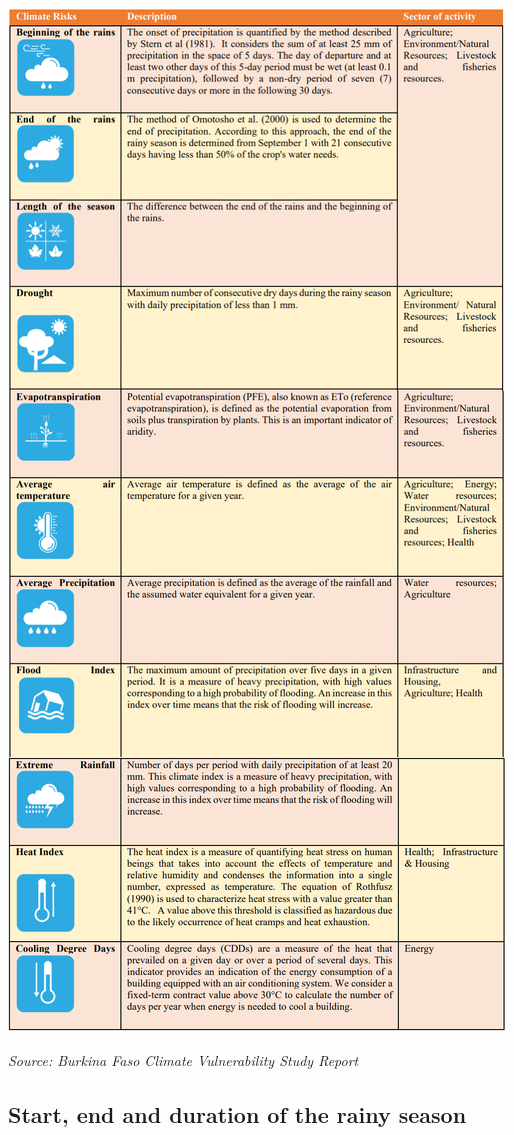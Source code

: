 \documentclass[
]{book}
\begin{document}
\includegraphics{Tables/Table 2.PNG}

\emph{Source: Burkina Faso Climate Vulnerability Study Report}

\subsection{Start, end and duration of the rainy season}\label{start-end-and-duration-of-the-rainy-season}
\end{document}
